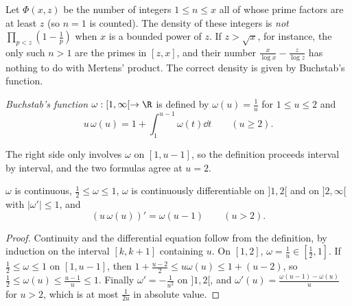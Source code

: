 Let $\Phi(x,z)$ be the number of integers $1\le n\le x$ all of whose prime factors are at least $z$ (so $n=1$ is counted). The density of these integers is \emph{not} $\prod_{p<z}(1-\frac1p)$ when $x$ is a bounded power of $z$. If $z>\sqrt x$, for instance, the only such $n>1$ are the primes in $[z,x]$, and their number $\frac x{\log x}-\frac z{\log z}$ has nothing to do with Mertens' product. The correct density is given by Buchstab's function.

\begin{definition}\label{def:buchstab}
\emph{Buchstab's function} $\omega:[1,\infty[\to\R$ is defined by $\omega(u)=\frac1u$ for $1\le u\le2$ and
\[
u\,\omega(u)=1+\int_1^{u-1}\omega(t)\dd t\qquad(u\ge2).
\]
\end{definition}

The right side only involves $\omega$ on $[1,u-1]$, so the definition proceeds interval by interval, and the two formulas agree at $u=2$.

\begin{lemma}\label{lem:buchstabprops}
$\omega$ is continuous, $\frac12\le\omega\le1$, $\omega$ is continuously differentiable on $]1,2[$ and on $]2,\infty[$ with $|\omega'|\le1$, and
\[
(u\,\omega(u))'=\omega(u-1)\qquad(u>2).
\]
\end{lemma}
\begin{proof}
Continuity and the differential equation follow from the definition, by induction on the interval $[k,k+1]$ containing $u$. On $[1,2]$, $\omega=\frac1u\in[\frac12,1]$. If $\frac12\le\omega\le1$ on $[1,u-1]$, then $1+\frac{u-2}2\le u\omega(u)\le1+(u-2)$, so $\frac12\le\omega(u)\le\frac{u-1}u\le1$. Finally $\omega'=-\frac1{u^2}$ on $]1,2[$, and $\omega'(u)=\frac{\omega(u-1)-\omega(u)}u$ for $u>2$, which is at most $\frac1{2u}$ in absolute value.
\end{proof}

